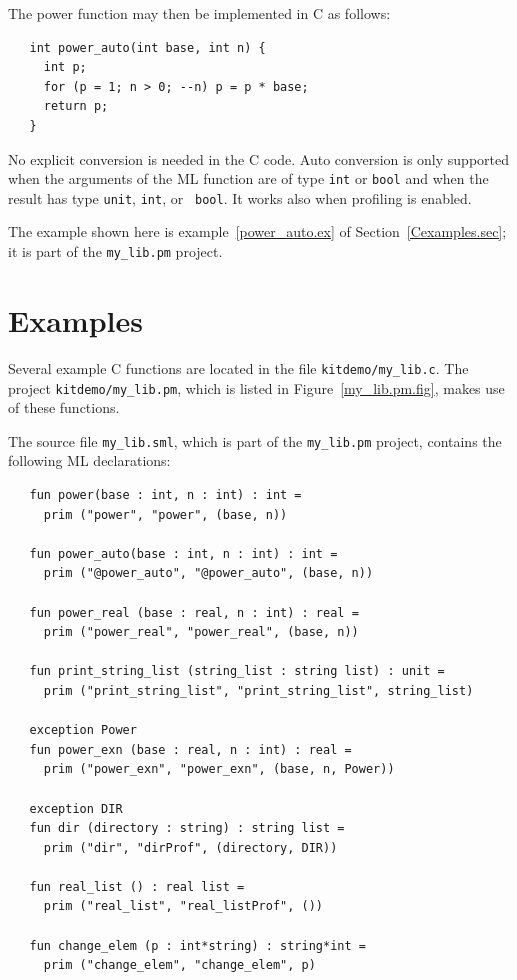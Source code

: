 \documentclass[12pt]{book}
\begin{document}
\noindent
The power function may then be implemented in C as follows:
\begin{verbatim}
   int power_auto(int base, int n) {
     int p;
     for (p = 1; n > 0; --n) p = p * base;
     return p;
   }
\end{verbatim}

\noindent
No explicit conversion is needed in the C code. Auto conversion is only
supported when the arguments of the ML function are of type {\tt int} or
{\tt bool} and when the result has type {\tt unit}, {\tt int}, or {\tt
  bool}. It works also when profiling is enabled.

The example shown here is example~\ref{power_auto.ex} of
Section~\ref{Cexamples.sec}; it is part of the \verb|my_lib.pm|
project.

\section{Examples\label{Cexamples.sec}}
%
%
%
Several example C functions are located in the file
\verb|kitdemo/my_lib.c|. The project \verb|kitdemo/my_lib.pm|, which
is listed in Figure~\ref{my_lib.pm.fig}, makes use of these functions.

The source file \verb|my_lib.sml|, which is part of the
\verb|my_lib.pm| project, contains the following ML declarations:
\begin{verbatim}
   fun power(base : int, n : int) : int = 
     prim ("power", "power", (base, n))

   fun power_auto(base : int, n : int) : int = 
     prim ("@power_auto", "@power_auto", (base, n))

   fun power_real (base : real, n : int) : real = 
     prim ("power_real", "power_real", (base, n))

   fun print_string_list (string_list : string list) : unit = 
     prim ("print_string_list", "print_string_list", string_list)

   exception Power
   fun power_exn (base : real, n : int) : real = 
     prim ("power_exn", "power_exn", (base, n, Power))

   exception DIR
   fun dir (directory : string) : string list = 
     prim ("dir", "dirProf", (directory, DIR))

   fun real_list () : real list = 
     prim ("real_list", "real_listProf", ())

   fun change_elem (p : int*string) : string*int =
     prim ("change_elem", "change_elem", p)
\end{verbatim}
\end{document}
